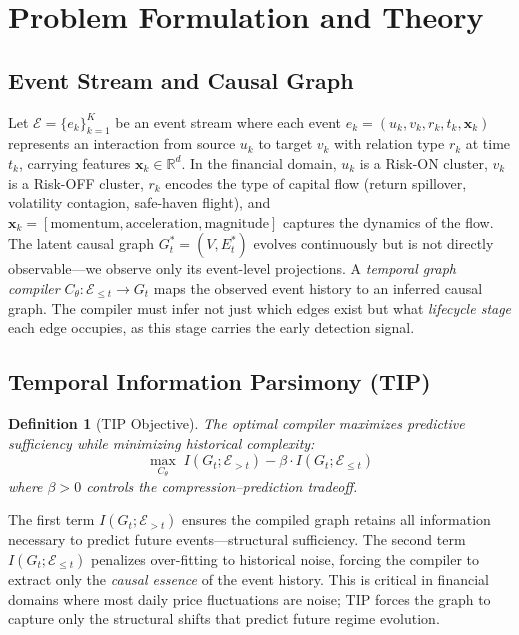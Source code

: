 \documentclass[11pt]{article}
\newtheorem{definition}{Definition}
\newcommand{\R}{\mathbb{R}}
\begin{document}
\section{Problem Formulation and Theory}

\subsection{Event Stream and Causal Graph}

Let $\mathcal{E} = \{e_k\}_{k=1}^{K}$ be an event stream where each event $e_k = (u_k, v_k, r_k, t_k, \mathbf{x}_k)$ represents an interaction from source $u_k$ to target $v_k$ with relation type $r_k$ at time $t_k$, carrying features $\mathbf{x}_k \in \R^d$. In the financial domain, $u_k$ is a Risk-ON cluster, $v_k$ is a Risk-OFF cluster, $r_k$ encodes the type of capital flow (return spillover, volatility contagion, safe-haven flight), and $\mathbf{x}_k = [\text{momentum}, \text{acceleration}, \text{magnitude}]$ captures the dynamics of the flow. The latent causal graph $G_t^* = (V, E_t^*)$ evolves continuously but is not directly observable---we observe only its event-level projections. A \emph{temporal graph compiler} $C_\theta: \mathcal{E}_{\leq t} \to G_t$ maps the observed event history to an inferred causal graph. The compiler must infer not just which edges exist but what \emph{lifecycle stage} each edge occupies, as this stage carries the early detection signal.

\subsection{Temporal Information Parsimony (TIP)}

\begin{definition}[TIP Objective]
The optimal compiler maximizes predictive sufficiency while minimizing historical complexity:
\begin{equation}
    \max_{C_\theta} \; I(G_t; \mathcal{E}_{>t}) - \beta \cdot I(G_t; \mathcal{E}_{\leq t})
    \label{eq:tip}
\end{equation}
where $\beta > 0$ controls the compression--prediction tradeoff.
\end{definition}

The first term $I(G_t; \mathcal{E}_{>t})$ ensures the compiled graph retains all information necessary to predict future events---structural sufficiency. The second term $I(G_t; \mathcal{E}_{\leq t})$ penalizes over-fitting to historical noise, forcing the compiler to extract only the \emph{causal essence} of the event history. This is critical in financial domains where most daily price fluctuations are noise; TIP forces the graph to capture only the structural shifts that predict future regime evolution.
\end{document}
